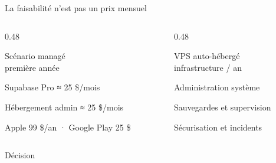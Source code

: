 \begin{frame}{La faisabilité n'est pas un prix mensuel}
\begin{columns}[T]
\begin{column}{0.48\linewidth}
\begin{block}{Scénario managé}
\\[-0.1em]\scriptsize première année
\end{block}
\small
\begin{tightitems}
  \item Supabase Pro ≈ 25 \$/mois
  \item Hébergement admin ≈ 25 \$/mois
  \item Apple 99 \$/an · Google Play 25 \$
\end{tightitems}
\end{column}
\begin{column}{0.48\linewidth}
\begin{block}{VPS auto-hébergé}
\\[-0.1em]\scriptsize infrastructure / an
\end{block}
\small
\begin{tightitems}
  \item Administration système
  \item Sauvegardes et supervision
  \item Sécurisation et incidents
\end{tightitems}
\end{column}
\end{columns}
\vspace{0.55em}
\begin{block}{Décision}
\centering{}
\end{block}
\end{frame}

